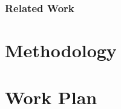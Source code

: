 \documentclass[11pt]{article}
\begin{document}
	\subsubsection{Related Work}
	

\section{Methodology}
\label{sec:Methodology}


\section{Work Plan}
\label{sec:WorkPlan}




\end{document}
